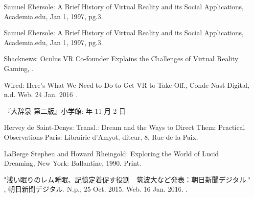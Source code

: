 \begin{bib}[100]
\begin{flushleft}
  Samuel Ebersole:
  \newblock A Brief History of Virtual Reality and its Social Applications, Academia.edu,
  \newblock Jan 1, 1997,  pg.3.
\end{flushleft}

\begin{flushleft}
  Samuel Ebersole:
  \newblock A Brief History of Virtual Reality and its Social Applications, Academia.edu,
  \newblock Jan 1, 1997,  pg.3.
\end{flushleft}

\begin{flushleft}
  Shacknews:
  \newblock Oculus VR Co-founder Explains the Challenges of Virtual Reality Gaming,
  .
\end{flushleft}

\begin{flushleft}
  Wired:
  \newblock Here’s What We Need to Do to Get VR to Take Off.,
  \newblock Conde Nast Digital, n.d. Web. 24 Jan. 2016
  .
\end{flushleft}

\begin{flushleft}
『大辞泉 第二版』小学館:
   年 11 月 2 日
 \end{flushleft}

\begin{flushleft}
Hervey de Saint-Denys:
  \newblock Transl.: Dream and the Ways to Direct Them: Practical Observations
  \newblock Paris: Librairie d'Amyot, diteur, 8, Rue de la Paix.
 \end{flushleft}
 
\begin{flushleft}
 LaBerge Stephen and Howard Rheingold:
  \newblock Exploring the World of Lucid Dreaming,
  \newblock New York: Ballantine, 1990. Print.
 \end{flushleft}
 
\begin{flushleft}
   \newblock "浅い眠りのレム睡眠、記憶定着促す役割　筑波大など発表：朝日新聞デジタル." ,
  \newblock 朝日新聞デジタル. N.p., 25 Oct. 2015.
  \newblock Web. 16 Jan. 2016.
  .
\end{flushleft}


\end{bib}
